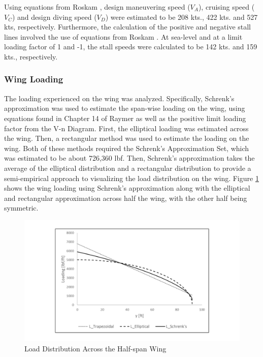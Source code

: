 Using equations from Roskam \cite{roskam_5}, design maneuvering speed ($V_{A}$), cruising speed ($V_{C}$) and design diving speed ($V_{D}$) were estimated to be 208 kts., 422 kts. and 527 kts, respectively. Furthermore, the calculation of the positive and negative stall lines involved the use of equations from Roskam \cite{roskam_5}. At sea-level and at a limit loading factor of 1 and -1, the stall speeds were calculated to be 142 kts. and 159 kts., respectively.

\subsubsection{Wing Loading}
\label{winlod}
The loading experienced on the wing was analyzed. Specifically, Schrenk's approximation was used to estimate the span-wise loading on the wing, using equations found in Chapter 14 of Raymer \cite{raymer} as well as the positive limit loading factor from the V-n Diagram. First, the elliptical loading was estimated across the wing. Then, a rectangular method was used to estimate the loading on the wing. Both of these methods required the Schrenk's Approximation Set, which was estimated to be about 726,360 lbf. Then, Schrenk's approximation takes the average of the elliptical distribution and a rectangular distribution to provide a semi-empirical approach to visualizing the load distribution on the wing. Figure \ref{schrenk} shows the wing loading using Schrenk's approximation along with the elliptical and rectangular approximation across half the wing, with the other half being symmetric. 

\begin{figure}[H]
    \centering
    \includegraphics[width=1.0\linewidth]{Photos/Loading.pdf}
    \caption{Load Distribution Across the Half-span Wing}
    \label{schrenk}
\end{figure}

